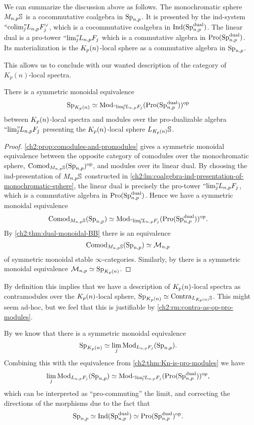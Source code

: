 We can summarize the discussion above as follows. The monochromatic sphere $M_{n,p}\mathbb{S}$ is a cocommutative coalgebra in $\mathrm{Sp}_{n,p}$. It is presented by the ind-system $``\!\operatorname{colim}\!"_{\hspace{-5pt} j} L_{n,p} F_j^\vee$, which is a cocommutative coalgebra in $\operatorname{Ind}(\mathrm{Sp}_{n,p}^{\mathrm{dual}})$. The linear dual is a pro-tower $``\!\lim\!"_{\hspace{-5pt} j} L_{n,p} F_j$ which is a commutative algebra in $\operatorname{Pro}(\mathrm{Sp}_{n,p}^{\mathrm{dual}})$. Its materialization is the ${K_p(n)}$-local sphere as a commutative algebra in $\mathrm{Sp}_{n,p}$. 

This allows us to conclude with our wanted description of the category of $K_p(n)$-local spectra. 

\begin{theorem}
    \label{ch2:thm:Kn-is-pro-modules}
    There is a symmetric monoidal equivalence 
    \[\mathrm{Sp}_{{K_p(n)}} \simeq \mathrm{Mod}_{``\!\lim\!"_{\hspace{-5pt} j} L_{n,p} F_j}(\operatorname{Pro}(\mathrm{Sp}_{n,p}^{\mathrm{dual}}))^{\mathrm{op}}\]
    between ${K_p(n)}$-local spectra and modules over the pro-dualizable algebra $``\!\lim\!"_{\hspace{-5pt} j} L_{n,p} F_j$ presenting the ${K_p(n)}$-local sphere $L_{K_p(n)}\mathbb{S}$. 
\end{theorem}
\begin{proof}
    \cref{ch2:prop:comodules-and-promodules} gives a symmetric monoidal equivalence between the opposite category of comodules over the monochromatic sphere, $\mathrm{Comod}_{M_{n,p} \mathbb{S}}(\mathrm{Sp}_{n,p})^{\mathrm{op}}$, and modules over its linear dual. By choosing the ind-presentation of $M_{n,p} \mathbb{S}$ constructed in \cref{ch2:lm:coalgebra-ind-presentation-of-monochromatic-sphere}, the linear dual is precisely the pro-tower $``\!\lim\!"_{\hspace{-5pt} j} L_{n,p} F_j$, which is a commutative algebra in $\operatorname{Pro}(\mathrm{Sp}_{n,p}^{\mathrm{dual}})$. Hence we have a symmetric monoidal equivalence 
    \[\mathrm{Comod}_{M_{n,p}\mathbb{S}}(\mathrm{Sp}_{n,p})\simeq \mathrm{Mod}_{``\!\lim\!"_{\hspace{-5pt} j} L_{n,p} F_j}(\operatorname{Pro}(\mathrm{Sp}_{n,p}^{\mathrm{dual}}))^{\mathrm{op}}.\]
    By \cref{ch2:thm:dual-monoidal-BB} there is an equivalence 
    \[\mathrm{Comod}_{M_{n,p}\mathbb{S}}(\mathrm{Sp}_{n,p})\simeq \mathcal{M}_{n,p}\] 
    of symmetric monoidal stable $\infty$-categories. Similarly, by \cite[6.19]{hovey-strickland_99} there is a symmetric monoidal equivalence $\mathcal{M}_{n,p} \simeq \mathrm{Sp}_{{K_p(n)}}$. 
\end{proof}

\begin{remark}
    By definition this implies that we have a description of ${K_p(n)}$-local spectra as contramodules over the ${K_p(n)}$-local sphere, $\mathrm{Sp}_{{K_p(n)}} \simeq \mathrm{Contra}_{L_{K_p(n)}\mathbb{S}}$. This might seem ad-hoc, but we feel that this is justifiable by \cref{ch2:rm:contra-as-op-pro-modules}.
\end{remark}

\begin{remark}
    By \cite[2.2.1, 2.2.7]{li-zhang_2023} we know that there is a symmetric monoidal equivalence 
    \[\mathrm{Sp}_{K_p(n)} \simeq \lim_j \mathrm{Mod}_{L_{n,p} F_j}(\mathrm{Sp}_{n,p}).\]
    Combining this with the equivalence from \cref{ch2:thm:Kn-is-pro-modules} we have 
    \[\lim_j \mathrm{Mod}_{L_{n,p} F_j}(\mathrm{Sp}_{n,p}) \simeq \mathrm{Mod}_{``\!\lim\!"_{\hspace{-5pt} j} L_{n,p} F_j}(\operatorname{Pro}(\mathrm{Sp}_{n,p}^{\mathrm{dual}}))^{\mathrm{op}},\]
    which can be interpreted as ``pro-commuting'' the limit, and correcting the directions of the morphisms due to the fact that 
    \[\mathrm{Sp}_{n,p}\simeq \operatorname{Ind}(\mathrm{Sp}_{n,p}^{\mathrm{dual}}) \simeq \operatorname{Pro}(\mathrm{Sp}_{n,p}^{\mathrm{dual}})^{\mathrm{op}}.\]
\end{remark}

